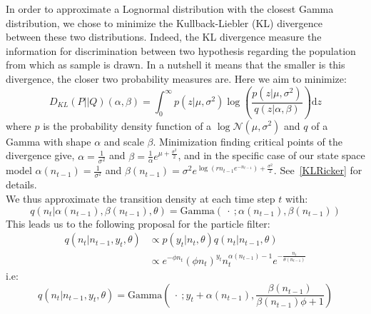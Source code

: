\documentclass{article}
\begin{document}
	In order to approximate a Lognormal distribution with the closest Gamma distribution, we chose to minimize the Kullback-Liebler (KL) divergence~\cite{kullback1951information} between these two distributions. Indeed, the KL divergence measure the information for discrimination between two hypothesis regarding the population from which as sample is drawn. In a nutshell it means that the smaller is this divergence, the closer two probability measures are. Here we aim to minimize:
	\begin{equation}
	D_{KL}(P||Q)(\alpha, \beta) = \int_{0}^{\infty}{p(z|\mu, \sigma^2)\log(\frac{p(z|\mu, \sigma^2)}{q(z|\alpha, \beta)})\mathrm{d}z}
	\end{equation}
	where $p$ is the probability density function of a $\log\mathcal{N}(\mu, \sigma^2)$ and $q$ of a Gamma with shape $\alpha$ and scale $\beta$. Minimization finding critical points of the divergence give, $\alpha =\frac{1}{\sigma^2}$ and $\beta=\frac{1}{\alpha}e^{\mu+\frac{\sigma^2}{2}}$, and in the specific case of our state space model $\alpha(n_{t-1})= \frac{1}{\sigma^2}$ and $\beta(n_{t-1})=\sigma^2e^{\log(rn_{t-1}e^{-n_{t-1}})+\frac{\sigma^2}{2}}$. See~\ref{KLRicker} for details. \\
	We thus approximate the transition density at each time step $t$ with:
	\begin{equation*}
	q(n_t|\alpha(n_{t-1}), \beta(n_{t-1}), \theta) = \mathrm{Gamma}(\ \cdot \ ; \alpha(n_{t-1}), \beta(n_{t-1}) )
	\end{equation*}
	This leads us to the following proposal for the particle filter:
	\begin{equation*}
	\begin{split}
	q(n_t|n_{t-1}, y_t, \theta) & \propto  p(y_t|n_t, \theta)q(n_t|n_{t-1}, \theta) \\
	& \propto e^{-\phi n_t}(\phi n_t)^{y_t}n_t^{\alpha(n_{t-1})-1}e^{-\frac{n_t}{\theta(n_{t-1})}}
	\end{split}
	\end{equation*}
	i.e:
	\begin{equation*}
	q(n_t|n_{t-1}, y_t, \theta) = \mathrm{Gamma}(\ \cdot \ ; y_t+\alpha(n_{t-1}), \frac{\beta(n_{t-1})}{\beta(n_{t-1})\phi + 1})\end{equation*} \\
	
\end{document}

